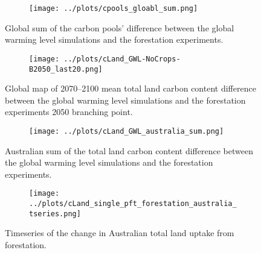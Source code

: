\documentclass[]{article}
\begin{document}
\begin{figure}[H]
    \centering
    \begin{subfigure}[b]{\linewidth}
        \texttt{[image: ../plots/cpools\_gloabl\_sum.png]}
    \end{subfigure}
    \caption{Global sum of the carbon pools' difference between the global warming level simulations and the forestation experiments.}
    \label{fig:global_cpools}
\end{figure}

\begin{figure}[H]
    \centering
    \begin{subfigure}[b]{\linewidth}
        \texttt{[image: ../plots/cLand\_GWL-NoCrops-B2050\_last20.png]}
    \end{subfigure}
    \caption{Global map of 2070--2100 mean total land carbon content difference between the global warming level simulations and the forestation experiments 2050 branching point.}
    \label{fig:map_cLand}
\end{figure}


\begin{figure}[H]
    \centering
    \begin{subfigure}[b]{\linewidth}
        \texttt{[image: ../plots/cLand\_GWL\_australia\_sum.png]}
    \end{subfigure}
    \caption{Australian sum of the total land carbon content difference between the global warming level simulations and the forestation experiments.}
    \label{fig:australia_cLand}
\end{figure}

\begin{figure}[H]
    \centering
    \begin{subfigure}[b]{\linewidth}
        \texttt{[image: ../plots/cLand\_single\_pft\_forestation\_australia\_tseries.png]}
    \end{subfigure}
    \caption{Timeseries of the change in Australian total land uptake from forestation.}
    \label{fig:australia_cland_timeseries}
\end{figure}
\end{document}
